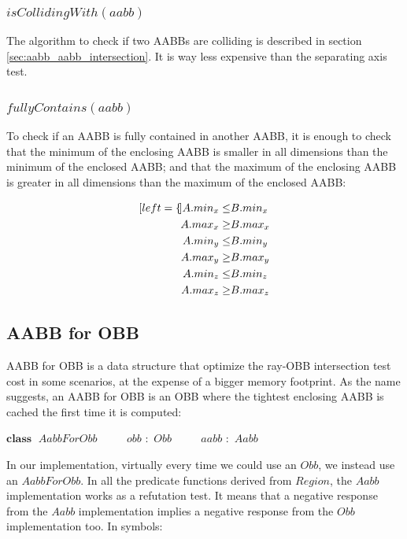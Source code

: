 \documentclass{PoliMi_MasterThesis}
\newcommand*\Class[1]{\State $\textbf{class} \;$ #1}
\newcommand*\Member[2]{\State $\qquad$ #1 $:$ #2}
\begin{document}
\subsubsection*{$isCollidingWith(aabb)$}
The algorithm to check if two AABBs are colliding is described in section \ref{sec:aabb_aabb_intersection}. It is way less expensive than the separating axis test.

\subsubsection*{$fullyContains(aabb)$}
To check if an AABB is fully contained in another AABB, it is enough to check that the minimum of the enclosing AABB is smaller in all dimensions than the minimum of the enclosed AABB; and that the maximum of the enclosing AABB is greater in all dimensions than the maximum of the enclosed AABB:

\begin{subequations}
	\begin{align*}[left=\empheqlbrace]
		A.min_x \leq& B.min_x \\
		A.max_x \geq& B.max_x \\
		A.min_y \leq& B.min_y \\
		A.max_y \geq& B.max_y \\
		A.min_z \leq& B.min_z \\
		A.max_z \geq& B.max_z
	\end{align*}
\end{subequations}

\subsection{AABB for OBB} \label{ssec:aabb_for_obb}
AABB for OBB is a data structure that optimize the ray-OBB intersection test cost in some scenarios, at the expense of a bigger memory footprint. As the name suggests, an AABB for OBB is an OBB where the tightest enclosing AABB is cached the first time it is computed:
\begin{algorithm}[H]
	\begin{algorithmic}
		\Class{$AabbForObb$}
		\Member{$obb$}{$Obb$}
		\Member{$aabb$}{$Aabb$}
	\end{algorithmic}
\end{algorithm} 

In our implementation, virtually every time we could use an $Obb$, we instead use an $AabbForObb$. In all the predicate functions derived from $Region$, the $Aabb$ implementation works as a refutation test. It means that a negative response from the $Aabb$ implementation implies a negative response from the $Obb$ implementation too. In symbols:
\end{document}
